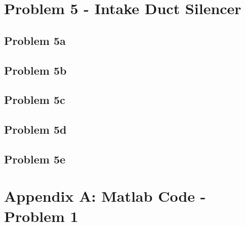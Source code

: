 \newpage
\section*{Problem 5 - Intake Duct Silencer}

\subsection*{Problem 5a}

\subsection*{Problem 5b}

\subsection*{Problem 5c}

\subsection*{Problem 5d}

\subsection*{Problem 5e}






\newpage
\section*{Appendix A:  Matlab Code - Problem 1}

